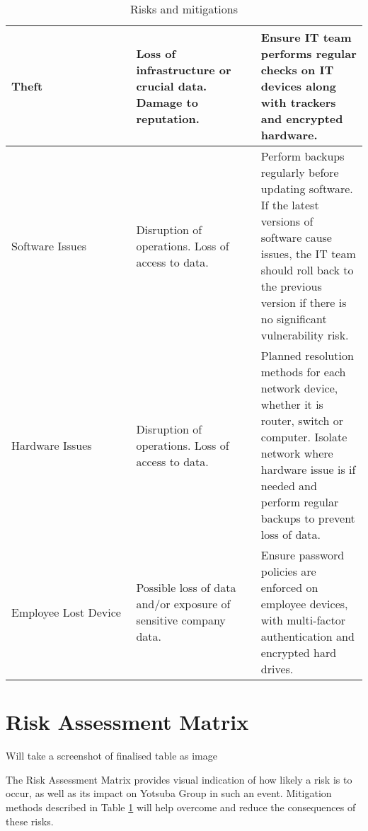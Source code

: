 \begin{table}[htp]
\begin{tabular}{|p{0.35\linewidth}|p{0.35\linewidth}|p{0.35\linewidth}|}
    Theft                                                & Loss of infrastructure or crucial data. Damage to reputation.                                                & Ensure IT team performs regular checks on IT devices along with trackers and encrypted hardware.                                                                                                                                   \\ \hline
    Software Issues                                      & Disruption of operations. Loss of access to data.                                                            & Perform backups regularly before updating software. If the latest versions of software cause issues, the IT team should roll back to the previous version if there is no significant vulnerability risk.                           \\ \hline
    Hardware Issues                                      & Disruption of operations. Loss of access to data.                                                            & Planned resolution methods for each network device, whether it is router, switch or computer. Isolate network where hardware issue is if needed and perform regular backups to prevent loss of data.                               \\ \hline
    Employee Lost Device                                 & Possible loss of data and/or exposure of sensitive company data.                                             & Ensure password policies are enforced on employee devices, with multi-factor authentication and encrypted hard drives.                                                                                                             \\ \hline
    \end{tabular}
    \caption{Risks and mitigations}
    \label{tab:risks_mitigations}
\end{table}

\section{Risk Assessment Matrix}

Will take a screenshot of finalised table as image

The Risk Assessment Matrix provides visual indication of how likely a risk is to occur, as well as its impact on Yotsuba Group in such an event. Mitigation methods described in Table \ref{tab:risks_mitigations} will help overcome and reduce the consequences of these risks.